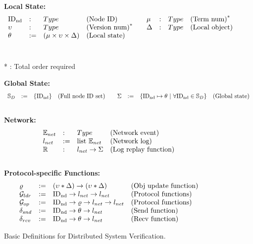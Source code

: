 \begin{figure}
\begin{small}
\raggedright

\textbf{Local State:}\\
$$
\begin{array}{lllllllll}
\mathrm{ID_{nd}} &:& Type & \mbox{(Node ID)} & & \mu &:& Type & \mbox{(Term num)}^* \\
\upsilon &:& Type & \mbox{(Version num)}^* & &\Delta &:& Type & \mbox{(Local object)}\\
\theta &:=& (\mu  \times \upsilon \times \Delta) & \mbox{(Local state)} & & & & & \\
\end{array}
$$
\\
\raggedleft

* : Total order required

\raggedright
\textbf{Global State:}\\
$$
\begin{array}{lllllllll}
\fullset &:=& \set{\nodeid} & \mbox{(Full node ID set)} & & \gstate &:=& \set{ \nodeid \mapsto \dstate ~\vert~ \forall \nodeid \in \fullset} & \mbox{(Global state)}\\
\end{array}
$$
\\
\textbf{Network:} \\
$$
\begin{array}{llll}
\packet &: & Type & \mbox{(Network event)}\\
\networklog &:=& \mbox{list}\ \packet & \mbox{(Network log)}\\
\replay &:& \networklog \rightarrow  \gstate& \mbox{(Log replay function)}\\
\end{array}
$$
\\
\textbf{Protocol-specific Functions:}  \\
$$
\begin{array}{llll}
	\updatefunc & := & (\seqnum * \dsvalue) \rightarrow   (\seqnum * \dsvalue)  &
	\mbox{(Obj update function)} \\
\gldrfunction & := & \nodeid \rightarrow \networklog \rightarrow \networklog  & \mbox{(Protocol functions)} \\
\gopfunction & := & \nodeid \rightarrow \updatefunc \rightarrow \networklog \rightarrow \networklog  & \mbox{(Protocol functions)} \\

\sendfunction & := & \nodeid \rightarrow \dstate \rightarrow \networklog & \mbox{(Send function)}\\
\recvfunction & := & \nodeid \rightarrow \dstate \rightarrow \networklog & \mbox{(Recv function)}\\
\end{array}
$$
\end{small}
\caption{Basic Definitions for Distributed System Verification.}
\label{fig:chapter:witnesspassing:basic-state}
\end{figure}

